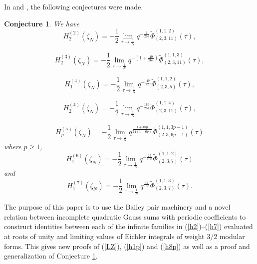 \documentclass[11pt,reqno]{amsart}
\newtheorem{conjecture}[theorem]{Conjecture}
\theoremstyle{definition}
\numberwithin{equation}{section}
\renewcommand{\=}{\;=\;}
\begin{document}
In  \cite[(3.23), (3.25b)--(3.25d), (3.35)]{hikami5} and \cite{hikami6}, the following conjectures were made.

\begin{conjecture} \label{hconj} We have
\begin{equation} \label{h2conj}
H_2^{(2)}(\zeta_N) = -\frac{1}{2}  \lim_{\tau \to \frac{1}{N}} q^{-\frac{1}{264}} \widetilde{\Phi}_{(2,3,11)}^{(1,1,2)} (\tau),
\end{equation}

\begin{equation} \label{h3conj}
H_2^{(3)}(\zeta_N) = -\frac{1}{2}  \lim_{\tau \to \frac{1}{N}} q^{-(1 + \frac{49}{264})} \widetilde{\Phi}_{(2,3,11)}^{(1,1,3)} (\tau),
\end{equation}

\begin{equation} \label{h41conj}
H_1^{(4)}(\zeta_N) =  -\frac{1}{2}  \lim_{\tau \to \frac{1}{N}} q^{-\frac{49}{120}} \widetilde{\Phi}_{(2,3,5)}^{(1,1,2)} (\tau),
\end{equation}

\begin{equation} \label{h4conj}
H_2^{(4)}(\zeta_N) = -\frac{1}{2}  \lim_{\tau \to \frac{1}{N}} q^{-\frac{169}{264}} \widetilde{\Phi}_{(2,3,11)}^{(1,1,4)} (\tau),
\end{equation}

\begin{equation} \label{h5pconj}
H_p^{(5)}(\zeta_N) = -\frac{1}{2}  \lim_{\tau \to \frac{1}{N}} q^{\frac{1+48p}{24(1-6p)}} \widetilde{\Phi}_{(2,3,6p-1)}^{(1,1,3p-1)} (\tau)
\end{equation}
where $p \geq 1$,
\begin{equation} \label{h6pconj}
H_1^{(6)}(\zeta_N) = -\frac{1}{2} \lim_{\tau \to \frac{1}{N}} q^{-\frac{25}{168}}  \widetilde{\Phi}_{(2,3,7)}^{(1,1,2)}(\tau) 
\end{equation}
and
\begin{equation} \label{h7pconj}
H_1^{(7)}(\zeta_N) = -\frac{1}{2} \lim_{\tau \to \frac{1}{N}} q^{\frac{47}{168}} \widetilde{\Phi}_{(2,3,7)}^{(1,1,3)}(\tau).
\end{equation}
\end{conjecture}

The purpose of this paper is to use the Bailey pair machinery and a novel relation between incomplete quadratic Gauss sums with periodic coefficients to construct identities between each of the infinite families in (\ref{h2})--(\ref{h7}) evaluated at roots of unity and limiting values of Eichler integrals of weight 3/2 modular forms.  This gives new proofs of (\ref{LZ}), (\ref{h1p}) and (\ref{h8p}) as well as a proof and generalization of Conjecture \ref{hconj}.
\end{document}
